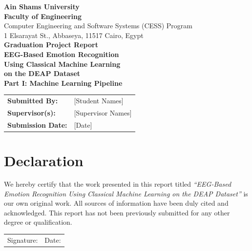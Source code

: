 \documentclass[12pt,a4paper]{report}
\begin{document}
\begin{titlepage}
\centering
\vspace*{1cm}

{\large\bfseries Ain Shams University\\Faculty of Engineering}\\[0.3cm]
{\normalsize Computer Engineering and Software Systems (CESS) Program}\\[0.3cm]
{\small 1 Elsarayat St., Abbaseya, 11517 Cairo, Egypt}\\[2cm]

{\LARGE\bfseries Graduation Project Report}\\[1.5cm]

{\huge\bfseries EEG-Based Emotion Recognition\\[0.3cm]
Using Classical Machine Learning\\[0.3cm]
on the DEAP Dataset}\\[2cm]

{\large\bfseries Part I: Machine Learning Pipeline}\\[2cm]

\vfill

{\large
\begin{tabular}{ll}
\textbf{Submitted By:}  & [Student Names] \\
\textbf{Supervisor(s):} & [Supervisor Names] \\
\textbf{Submission Date:} & [Date] \\
\end{tabular}
}

\end{titlepage}

\newpage
\thispagestyle{empty}
\chapter*{Declaration}

We hereby certify that the work presented in this report titled
\textit{``EEG-Based Emotion Recognition Using Classical Machine Learning on the DEAP Dataset''}
is our own original work. All sources of information have been duly cited and
acknowledged. This report has not been previously submitted for any other degree
or qualification.

\vspace{3cm}
\noindent
\begin{tabular}{p{6cm}p{6cm}}
Signature: \hrulefill & Date: \hrulefill \\
\end{tabular}
\end{document}
